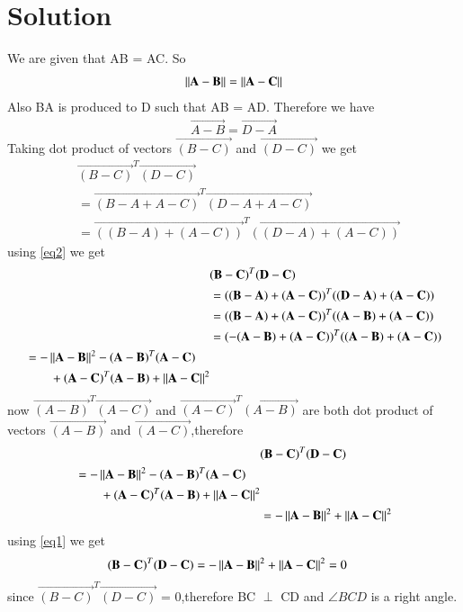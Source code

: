 \documentclass[journal,12pt,twocolumn]{IEEEtran}
\begin{document}
\section{\textbf{Solution}}
\renewcommand{\thefigure}{\arabic{figure}}
\begin{figure}[!h]
  \centering
  \caption{}
  \label{myfig}
\end{figure}
We are given that AB = AC. So
\begin{align}
  \left\lVert\mathbf{A-B}\right\rVert = \left\lVert\mathbf{A-C}\right\rVert \label{eq1}
\end{align}
Also BA is produced to D such that AB = AD. Therefore we have
\begin{align}
  \vec{A-B} = \vec{D-A} \label{eq2}
\end{align}
Taking dot product of vectors $\vec{(B-C)}$ and $\vec{(D-C)}$ we get
\begin{align*}
  &\vec{(B-C)}^T\vec{(D-C)}\\
  &= \vec{(B-A+A-C)}^T\vec{(D-A+A-C)}\\
  &= \vec{((B-A)+(A-C))}^T\vec{((D-A)+(A-C))}
\end{align*}
using \eqref{eq2} we get
\begin{align*}
  &\mathbf{(B-C)}^T\mathbf{(D-C)} \\
  &= \mathbf{((B-A)+(A-C))}^T\mathbf{((D-A)+(A-C))}\\
  &= \mathbf{((B-A)+(A-C))}^T\mathbf{((A-B)+(A-C))}\\
  &= \mathbf{(-(A-B)+(A-C))}^T\mathbf{((A-B)+(A-C))}\\
  \begin{split}
    &= -\left\lVert\mathbf{A-B}\right\rVert^2-\mathbf{(A-B)}^T\mathbf{(A-C)}\\
    &\qquad +\mathbf{(A-C)}^T\mathbf{(A-B)}+\left\lVert\mathbf{A-C}\right\rVert^2
  \end{split}
\end{align*}
now $\vec{(A-B)}^T\vec{(A-C)}$ and $\vec{(A-C)}^T\vec{(A-B)}$ are both dot product of vectors $\vec{(A-B)}$ and $\vec{(A-C)}$,therefore
\begin{align*}
  &\mathbf{(B-C)}^T\mathbf{(D-C)}\\
  \begin{split}
    &= -\left\lVert\mathbf{A-B}\right\rVert^2-\mathbf{(A-B)}^T\mathbf{(A-C)}\\
                                &\qquad +\mathbf{(A-C)}^T\mathbf{(A-B)}+\left\lVert\mathbf{A-C}\right\rVert^2
  \end{split}\\
  &= -\left\lVert\mathbf{A-B}\right\rVert^2+\left\lVert\mathbf{A-C}\right\rVert^2
\end{align*}
using \eqref{eq1} we get
\begin{align}
  \mathbf{(B-C)}^T\mathbf{(D-C)} &= -\left\lVert\mathbf{A-B}\right\rVert^2+\left\lVert\mathbf{A-C}\right\rVert^2 = 0
\end{align}
since $\vec{(B-C)}^T\vec{(D-C)}$ = 0,therefore BC $\perp$ CD and $\angle{BCD}$ is a right angle.
\end{document}

